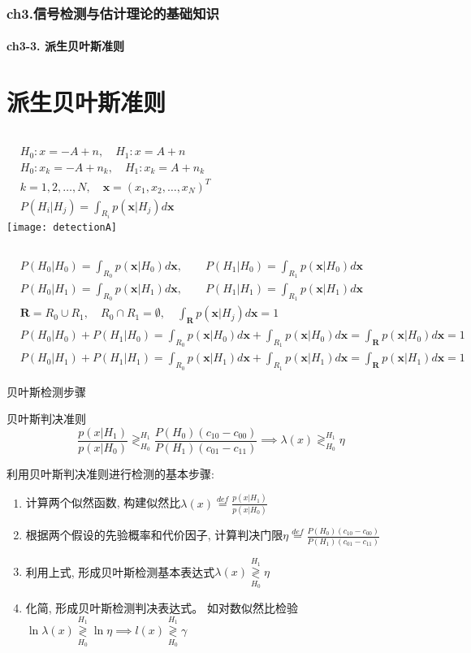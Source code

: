 \begin{frame}[shrink]
  \frametitle{ch3.信号检测与估计理论的基础知识}
  \framesubtitle{ch3-3. 派生贝叶斯准则}
  \tableofcontents[hideallsubsections]
\end{frame}

\section{派生贝叶斯准则}

\begin{frame}
\begin{columns}
	\begin{align*}
	&H_0: x=-A+n,\quad H_1: x=A+n\\
	&H_0: x_k=-A+n_k,\quad H_1: x_k=A+n_k\\
	&k=1,2,\dots,N,\quad \bm{x}=(x_1,x_2,\dots,x_N)^{T}\\
	&P(H_i|H_j)=\int_{R_i}p(\bm{x}|H_j)d\bm{x}
	\end{align*}
	\texttt{[image: detectionA]}
\end{columns}
\begin{align*}
&P(H_0|H_0)=\int_{R_0}p(\bm{x}|H_0)d\bm{x},\qquad P(H_1|H_0)=\int_{R_1}p(\bm{x}|H_0)d\bm{x}\\
&P(H_0|H_1)=\int_{R_0}p(\bm{x}|H_1)d\bm{x},\qquad P(H_1|H_1)=\int_{R_1}p(\bm{x}|H_1)d\bm{x}\\
&\bm{R}=R_0\cup R_1,\quad R_0\cap R_1=\emptyset, \quad \int_{\bm{R}}p(\bm{x}|H_j)d\bm{x}=1\\
&P(H_0|H_0)+P(H_1|H_0)=\int_{R_0}p(\bm{x}|H_0)d\bm{x}+\int_{R_1}p(\bm{x}|H_0)d\bm{x}=\int_{\bm{R}}p(\bm{x}|H_0)d\bm{x}=1\\
&P(H_0|H_1)+P(H_1|H_1)=\int_{R_0}p(\bm{x}|H_1)d\bm{x}+\int_{R_1}p(\bm{x}|H_1)d\bm{x}=\int_{\bm{R}}p(\bm{x}|H_1)d\bm{x}=1
\end{align*}
\end{frame}

\begin{frame}{贝叶斯检测步骤}
\begin{block}{贝叶斯判决准则}
\[ \frac{p(x|H_1)}{p(x|H_0)}\mathop{\gtrless}_{H_0}^{H_1}\frac{P(H_0)(c_{10}-c_{00})}{P(H_1)(c_{01}-c_{11})} \implies \lambda(x)\mathop{\gtrless}_{H_0}^{H_1}\eta \]
\end{block}
利用贝叶斯判决准则进行检测的基本步骤:
\begin{enumerate}
\item 计算两个似然函数, 构建似然比$\lambda(x)\mathop{=}\limits^{def}\frac{p(x|H_1)}{p(x|H_0)}$
\item 根据两个假设的先验概率和代价因子, 计算判决门限$\eta\mathop{=}\limits^{def}\frac{P(H_0)(c_{10}-c_{00})}{P(H_1)(c_{01}-c_{11})}$
\item 利用上式, 形成贝叶斯检测基本表达式$\lambda(x)\mathop{\gtrless}\limits_{H_0}^{H_1}\eta$
\item 化简, 形成贝叶斯检测判决表达式。 如对数似然比检验$\ln\lambda(x)\mathop{\gtrless}\limits_{H_0}^{H_1}\ln\eta\implies l(x)\mathop{\gtrless}\limits_{H_0}^{H_1}\gamma$
\end{enumerate}
\end{frame}

